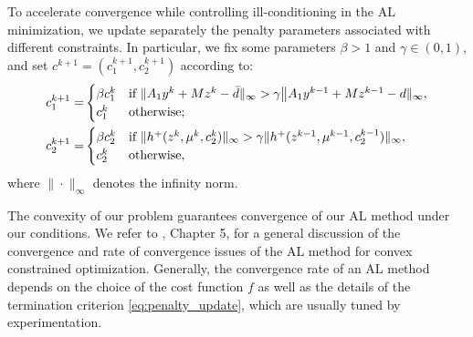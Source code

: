 \documentclass[11pt]{article}
\begin{document}
To accelerate convergence while controlling ill-conditioning in the AL minimization, we update separately the penalty parameters associated with different constraints. In particular, we fix some parameters $\beta > 1$ and $\gamma \in (0,1)$, and set $c^{k+1} = (c_1^{k+1}, c_2^{k+1})$ according to:
\begin{equation}
    \label{eq:penalty_update}
    \begin{aligned}
    c^{k+1}_1=&\begin{cases}
    \beta c^k_1&\hbox{if }\|A_1y^k+Mz^k-\bar d\|_\infty>\gamma \big\|A_1y^{k-1}+Mz^{k-1}-d\|_\infty,\\
    c^k_1&\hbox{otherwise};
\end{cases}\\
c^{k+1}_2=&\begin{cases}
    \beta c^k_2&\hbox{if }\|h^+(z^k,\mu^k,c^k_2)\|_\infty>\gamma \|h^+(z^{k-1},\mu^{k-1},c^{k-1}_2)\|_\infty,\\
    c^k_2&\hbox{otherwise},
\end{cases}
\end{aligned}
\end{equation}
where $\|\cdot\|_\infty$ denotes the infinity norm.

The convexity of our problem guarantees convergence of our AL method under our conditions. We refer to \cite{Ber82a}, Chapter 5, for a general discussion of the convergence and rate of convergence issues of the AL method for convex constrained optimization. Generally, the convergence rate  of an AL method depends on the choice of the cost function $f$ as well as the details of the termination criterion \eqref{eq:penalty_update}, which are usually tuned by experimentation.
\end{document}
